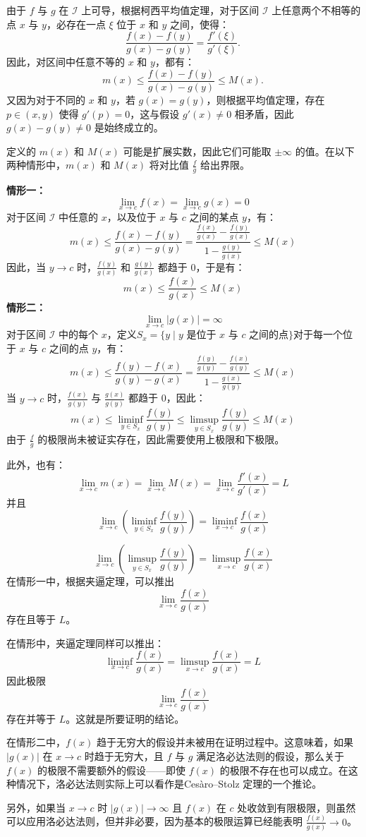 由于 $f$ 与 $g$ 在 $\mathcal{I}$ 上可导，根据柯西平均值定理，对于区间 $\mathcal{I}$ 上任意两个不相等的点 $x$ 与 $y$，必存在一点 $\xi$ 位于 $x$ 和 $y$ 之间，使得：
$$
\frac{f(x) - f(y)}{g(x) - g(y)} = \frac{f'(\xi)}{g'(\xi)}.~
$$
因此，对区间中任意不等的 $x$ 和 $y$，都有：
$$
m(x) \leq \frac{f(x) - f(y)}{g(x) - g(y)} \leq M(x).~
$$
又因为对于不同的 $x$ 和 $y$，若 $g(x) = g(y)$，则根据平均值定理，存在 $p \in (x, y)$ 使得 $g'(p) = 0$，这与假设 $g'(x) \ne 0$ 相矛盾，因此 $g(x) - g(y) \ne 0$ 是始终成立的。

定义的 $m(x)$ 和 $M(x)$ 可能是扩展实数，因此它们可能取 $\pm\infty$ 的值。在以下两种情形中，$m(x)$ 和 $M(x)$ 将对比值 $\frac{f}{g}$ 给出界限。

\textbf{情形一：}
$$\lim_{x \to c} f(x) = \lim_{x \to c} g(x) = 0~$$
对于区间 $\mathcal{I}$ 中任意的 $x$，以及位于 $x$ 与 $c$ 之间的某点 $y$，有：
$$
m(x) \leq \frac{f(x) - f(y)}{g(x) - g(y)} = \frac{\frac{f(x)}{g(x)} - \frac{f(y)}{g(x)}}{1 - \frac{g(y)}{g(x)}} \leq M(x)~
$$
因此，当 $y \to c$ 时，$\frac{f(y)}{g(x)}$ 和 $\frac{g(y)}{g(x)}$ 都趋于 0，于是有：
$$
m(x) \leq \frac{f(x)}{g(x)} \leq M(x)~
$$
\textbf{情形二：}
$$
\lim_{x \to c} |g(x)| = \infty~
$$
对于区间 $\mathcal{I}$ 中的每个 $x$，定义$S_x = \{y \mid y \text{ 是位于 } x \text{ 与 } c \text{ 之间的点}\}$对于每一个位于 $x$ 与 $c$ 之间的点 $y$，有：
$$
m(x) \leq \frac{f(y) - f(x)}{g(y) - g(x)} = \frac{\frac{f(y)}{g(y)} - \frac{f(x)}{g(y)}}{1 - \frac{g(x)}{g(y)}} \leq M(x)~
$$
当 $y \to c$ 时，$\frac{f(x)}{g(y)}$ 与 $\frac{g(x)}{g(y)}$ 都趋于 0，因此：
$$
m(x) \leq \liminf_{y \in S_x} \frac{f(y)}{g(y)} \leq \limsup_{y \in S_x} \frac{f(y)}{g(y)} \leq M(x)~
$$
由于 $\frac{f}{g}$ 的极限尚未被证实存在，因此需要使用上极限和下极限。

此外，也有：
$$
\lim_{x \to c} m(x) = \lim_{x \to c} M(x) = \lim_{x \to c} \frac{f'(x)}{g'(x)} = L~
$$
并且
$$
\lim_{x \to c} \left(\liminf_{y \in S_x} \frac{f(y)}{g(y)} \right) = \liminf_{x \to c} \frac{f(x)}{g(x)}~
$$

$$
\lim_{x \to c} \left(\limsup_{y \in S_x} \frac{f(y)}{g(y)} \right) = \limsup_{x \to c} \frac{f(x)}{g(x)}~
$$
在情形一中，根据夹逼定理，可以推出 
$$\lim_{x \to c} \frac{f(x)}{g(x)}~$$ 
存在且等于 $L$。

在情形中，夹逼定理同样可以推出：
$$
\liminf_{x \to c} \frac{f(x)}{g(x)} = \limsup_{x \to c} \frac{f(x)}{g(x)} = L~
$$
因此极限 
$$\lim_{x \to c} \frac{f(x)}{g(x)}~$$ 
存在并等于 $L$。这就是所要证明的结论。

在情形二中，$f(x)$ 趋于无穷大的假设并未被用在证明过程中。这意味着，如果 $|g(x)|$ 在 $x \to c$ 时趋于无穷大，且 $f$ 与 $g$ 满足洛必达法则的假设，那么关于 $f(x)$ 的极限不需要额外的假设——即使 $f(x)$ 的极限不存在也可以成立。在这种情况下，洛必达法则实际上可以看作是Cesàro–Stolz 定理的一个推论。

另外，如果当 $x \to c$ 时 $|g(x)| \to \infty$ 且 $f(x)$ 在 $c$ 处收敛到有限极限，则虽然可以应用洛必达法则，但并非必要，因为基本的极限运算已经能表明 $\frac{f(x)}{g(x)} \to 0$。
